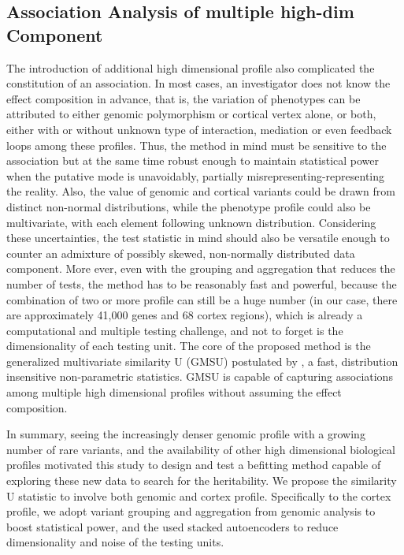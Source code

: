 \subsection{Association Analysis of multiple high-dim Component}
The introduction of additional high dimensional profile also complicated the constitution of an association. In most cases, an investigator does not know the effect composition in advance, that is, the variation of phenotypes can be attributed to either genomic polymorphism or cortical vertex alone, or both, either with or without unknown type of interaction, mediation or even feedback loops among these profiles. Thus, the method in mind must be sensitive to the association but at the same time robust enough to maintain statistical power when the putative mode is unavoidably, partially misrepresenting-representing the reality. Also, the value of genomic and cortical variants could be drawn from distinct non-normal distributions, while the phenotype profile could also be multivariate, with each element following unknown distribution. Considering these uncertainties, the test statistic in mind should also be versatile enough to counter an admixture of possibly skewed, non-normally distributed data component. More ever, even with the grouping and aggregation that reduces the number of tests, the method has to be reasonably fast and powerful, because the combination of two or more profile can still be a huge number (in our case, there are approximately 41,000 genes and 68 cortex regions), which is already a computational and multiple testing challenge, and not to forget is the dimensionality of each testing unit. The core of the proposed method is the generalized multivariate similarity U (GMSU) postulated by \cite{UST1, UST2}, a fast, distribution insensitive non-parametric statistics. GMSU is capable of capturing associations among multiple high dimensional profiles without assuming the effect composition.

In summary, seeing the increasingly denser genomic profile with a growing number of rare variants, and the availability of other high dimensional biological profiles motivated this study to design and test a befitting method capable of exploring these new data to search for the heritability. We propose the similarity U statistic to involve both genomic and cortex profile. Specifically to the cortex profile, we adopt variant grouping and aggregation from genomic analysis to boost statistical power, and the used stacked autoencoders to reduce dimensionality and noise of the testing units.